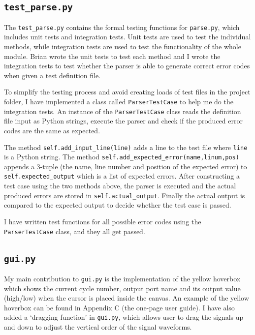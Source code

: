 \documentclass[10pt,a4paper]{article}
\begin{document}
\subsection{\texttt{test\_parse.py}}
\label{sec:orga21513a}

The \texttt{test\_parse.py} contains the formal testing functions for
\texttt{parse.py}, which includes unit tests and integration tests. Unit
tests are used to test the individual methods, while integration tests
are used to test the functionality of the whole module. Brian wrote
the unit tests to test each method and I wrote the integration tests
to test whether the parser is able to generate correct error codes
when given a test definition file.

To simplify the testing process and avoid creating loads of test files
in the project folder, I have implemented a class called
\texttt{ParserTestCase} to help me do the integration tests. An instance of the
\texttt{ParserTestCase} class reads the definition file input as Python
strings, execute the parser and check if the produced error codes are
the same as expected.

The method \texttt{self.add\_input\_line(line)} adds a line to the test file
where \texttt{line} is a Python string. The method
\texttt{self.add\_expected\_error(name,linum,pos)} appends a 3-tuple (the name,
line number and position of the expected error) to
\texttt{self.expected\_output} which is a list of expected errors. After
constructing a test case using the two methods above, the parser is
executed and the actual produced errors are stored in
\texttt{self.actual\_output}. Finally the actual output is compared to the
expected output to decide whether the test case is passed.

I have written test functions for all possible error codes using the
\texttt{ParserTestCase} class, and they all get passed. 

\subsection{\texttt{gui.py}}
\label{sec:org5d95e3f}

My main contribution to \texttt{gui.py} is the implementation of the yellow
hoverbox which shows the current cycle number, output port name and
its output value (high/low) when the cursor is placed inside the
canvas. An example of the yellow hoverbox can be found in Appendix C
(the one-page user guide). I have also added a `dragging function' in
\texttt{gui.py}, which allows user to drag the signals up and down to adjust
the vertical order of the signal waveforms.
\end{document}
